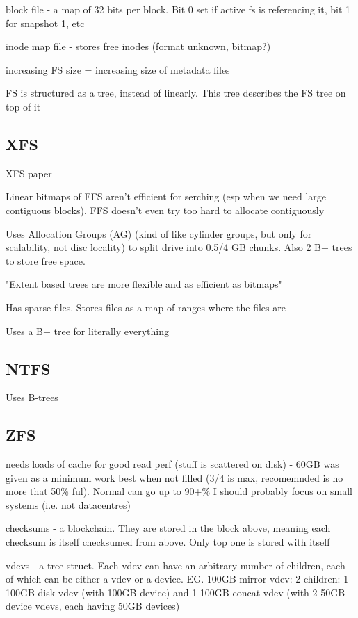 \documentclass[a4paper]{report}
\begin{document}
        block file - a map of 32 bits per block. Bit 0 set if active fs is referencing
        it, bit 1 for snapshot 1, etc

        inode map file - stores free inodes (format unknown, bitmap?)

        increasing FS size = increasing size of metadata files

        FS is structured as a tree, instead of linearly. This tree describes
        the FS tree on top of it

    \subsection{XFS}
        XFS paper

        Linear bitmaps of FFS aren't efficient for serching (esp when we need
        large contiguous blocks). FFS doesn't even try too hard to allocate
        contiguously

        Uses Allocation Groups (AG) (kind of like cylinder groups, but only for
        scalability, not disc locality) to split drive into 0.5/4 GB chunks.
        Also 2 B+ trees to store free space.

        "Extent based trees are more flexible and as efficient as bitmaps"

        Has sparse files. Stores files as a map of ranges where the files are

        Uses a B+ tree for literally everything

    \subsection{NTFS}

        Uses B-trees


    \subsection{ZFS}
        needs loads of cache for good read perf (stuff is scattered on disk) -
        60GB was given as a minimum work best when not filled (3/4 is max,
        recomemnded is no more that 50\% ful). Normal can go up to 90+\% I
        should probably focus on small systems (i.e. not datacentres)

        checksums - a blockchain. They are stored in the block above, meaning
        each checksum is itself checksumed from above. Only top one is stored
        with itself

        vdevs - a tree struct. Each vdev can have an arbitrary number of
        children, each of which can be either a vdev or a device. EG. 100GB
        mirror vdev: 2 children: 1 100GB disk vdev (with 100GB device) and 1
        100GB concat vdev (with 2 50GB device vdevs, each having 50GB devices)
\end{document}
